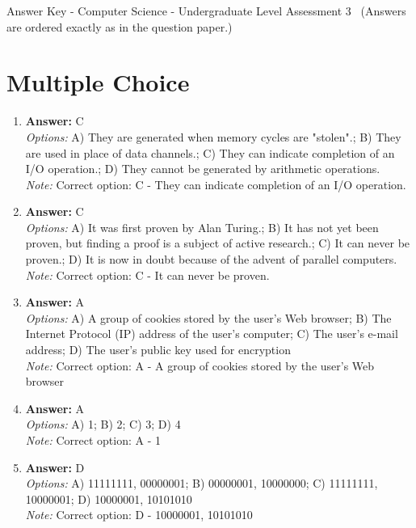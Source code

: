 \documentclass[12pt]{article}
\begin{document}
\begin{center}
Answer Key - Computer Science - Undergraduate Level Assessment 3 \
\small (Answers are ordered exactly as in the question paper.)
\end{center}

\section*{Multiple Choice}
\begin{enumerate}[label=\arabic*.]
\item \textbf{Answer:} C
\\ \textit{Options:} A) They are generated when memory cycles are "stolen".; B) They are used in place of data channels.; C) They can indicate completion of an I/O operation.; D) They cannot be generated by arithmetic operations.
\\ \textit{Note:} Correct option: C - They can indicate completion of an I/O operation.
\item \textbf{Answer:} C
\\ \textit{Options:} A) It was first proven by Alan Turing.; B) It has not yet been proven, but finding a proof is a subject of active research.; C) It can never be proven.; D) It is now in doubt because of the advent of parallel computers.
\\ \textit{Note:} Correct option: C - It can never be proven.
\item \textbf{Answer:} A
\\ \textit{Options:} A) A group of cookies stored by the user's Web browser; B) The Internet Protocol (IP) address of the user's computer; C) The user's e-mail address; D) The user's public key used for encryption
\\ \textit{Note:} Correct option: A - A group of cookies stored by the user's Web browser
\item \textbf{Answer:} A
\\ \textit{Options:} A) 1; B) 2; C) 3; D) 4
\\ \textit{Note:} Correct option: A - 1
\item \textbf{Answer:} D
\\ \textit{Options:} A) 11111111, 00000001; B) 00000001, 10000000; C) 11111111, 10000001; D) 10000001, 10101010
\\ \textit{Note:} Correct option: D - 10000001, 10101010
\end{enumerate}
\end{document}
